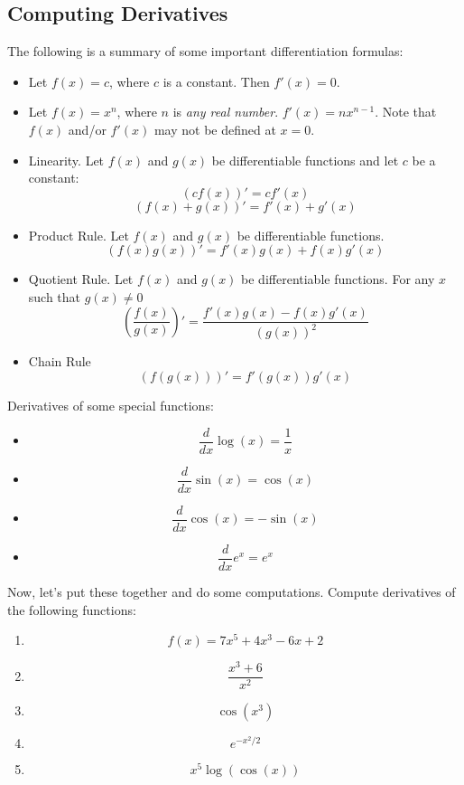 \documentclass[12pt,a4paper]{article} %
\begin{document}
\subsection{Computing Derivatives}
The following is a summary of some important differentiation formulas:
\begin{itemize}
\item Let $f(x) = c$, where $c$ is a constant. Then $f'(x)=0$.
\item Let $f(x) = x^n$, where $n$ is \emph{any real number}. $f'(x) = nx^{n-1}$. Note that $f(x)$ and/or $f'(x)$ may not be defined at $x=0$.
\item Linearity. Let $f(x)$ and $g(x)$ be differentiable functions and let $c$ be a constant:
$$\left(cf(x)\right)' = cf'(x)$$
$$\left(f(x)+g(x)\right)' = f'(x) + g'(x)$$
\item Product Rule. Let $f(x)$ and $g(x)$ be differentiable functions.
$$\left(f(x)g(x)\right)' = f'(x)g(x) + f(x)g'(x)$$
\item Quotient Rule. Let $f(x)$ and $g(x)$ be differentiable functions. For any $x$ such that $g(x)\neq0$
$$\left(\frac{f(x)}{g(x)}\right)' = \frac{f'(x)g(x)-f(x)g'(x)}{\left(g(x)\right)^2}$$
\item Chain Rule
$$\left(f(g(x))\right)' = f'(g(x))g'(x)$$
\end{itemize}
Derivatives of some special functions:
\begin{itemize}
\item $$\frac{d}{dx}\log(x) = \frac1{x}$$
\item $$\frac{d}{dx}\sin(x) = \cos(x)$$
\item $$\frac{d}{dx}\cos(x) = -\sin(x)$$
\item $$\frac{d}{dx}e^x = e^x$$
\end{itemize}
Now, let's put these together and do some computations. Compute derivatives of the following functions:
\begin{enumerate}
\item $$f(x) = 7x^5+4x^3-6x+2$$
\item $$\frac{x^3+6}{x^2}$$
\item $$\cos(x^3)$$
\item $$e^{-x^2/2}$$
\item $$x^5\log(\cos(x))$$

\end{enumerate}
\end{document}
